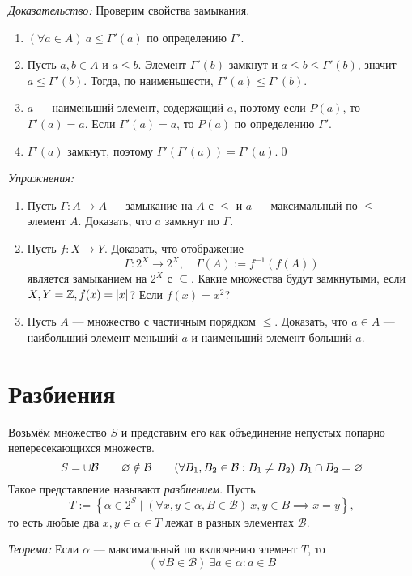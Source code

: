   {\it Доказательство:}
Проверим свойства замыкания.
\begin{enumerate}
  \item{}$(\forall a\in A)~a\leq \Gamma'(a)$ по определению $\Gamma'$.

  \item{}Пусть $a,b\in A$ и $a\leq b$. Элемент $\Gamma'(b)$ замкнут и
  $a\leq b\leq\Gamma'(b)$, значит $a\leq\Gamma'(b)$. Тогда, по наименьшести,
  $\Gamma'(a)\leq\Gamma'(b)$.

  \item{}$a$ --- наименьший элемент, содержащий $a$, поэтому
  если $P(a)$, то $\Gamma'(a)=a$. Если $\Gamma'(a)=a$, то $P(a)$
  по определению $\Gamma'$.

  \item{}$\Gamma'(a)$ замкнут, поэтому $\Gamma'(\Gamma'(a))=\Gamma'(a)$.\qed
\end{enumerate}

{\it Упражнения:}
\begin{enumerate}
  \item{}Пусть $\Gamma:A\to A$ --- замыкание на $A$ с $\leq$ и $a$ ---
  максимальный по $\leq$ элемент $A$. Доказать, что $a$ замкнут по $\Gamma$.
  \item{}Пусть $f:X\to Y$. Доказать, что отображение
  \[
    \Gamma:2^{X}\to 2^{X},\quad \Gamma(A):= f^{-1}(f(A))
  \]
  является замыканием на $2^{X}$ с $\subseteq$. Какие множества
  будут замкнутыми, если $X,Y=\mathbb Z,f(x)=|x|$? Если $f(x)=x^{2}$?
  \item{}Пусть $A$ --- множество с частичным порядком $\leq$.
  Доказать, что $a\in A$ --- наибольший элемент меньший $a$
  и наименьший элемент больший $a$.
\end{enumerate}

\section{Разбиения}

\newcommand\B{\mathcal B}
Возьмём множество $S$ и представим его как объединение непустых
попарно непересекающихся множеств.
\[
  S=\cup\B\qquad
  \eset\notin\B\qquad
  (\forall B_1,B_2\in\B:B_1\neq B_2)~B_1\cap B_2=\eset
\]
Такое представление называют {\it разбиением}. Пусть
\[
  T:=\left\{\alpha\in 2^{S}\;\big|\; (\forall x,y\in\alpha,B\in\B)~
  x,y\in B\implies x=y\right\},
\]
то есть любые два $x,y\in \alpha\in T$ лежат в разных
элементах $\B$.

\vspace{1em}
{\it Теорема:} Если $\alpha$ --- максимальный по включению элемент $T$, то
\begin{equation}\label{eq:thm_ex_in_class}
  (\forall B\in\B)~\exists a\in\alpha:a\in B
\end{equation}

